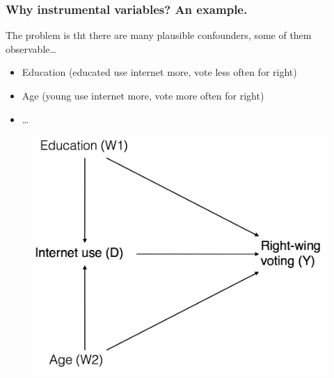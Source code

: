 \documentclass[12pt,english,dvipsnames,aspectratio=169,handout]{beamer}\usepackage[]{graphicx}\usepackage[]{xcolor}
\begin{document}
\begin{frame}
  \frametitle{Why instrumental variables? An example.}
  The problem is tht there are many plausible confounders, some of them observable\ldots
	\begin{itemize} \scriptsize
		\item Education (educated use internet more, vote less often for right)
		\item Age (young use internet more, vote more often for right)
		\item \ldots
	\end {itemize}
	 \begin{figure} 
    \includegraphics[height=.45\textheight,keepaspectratio=true]{../04-figures/05/02-w5_dag_2.png}
    \end{figure}
\end{frame}
\end{document}
